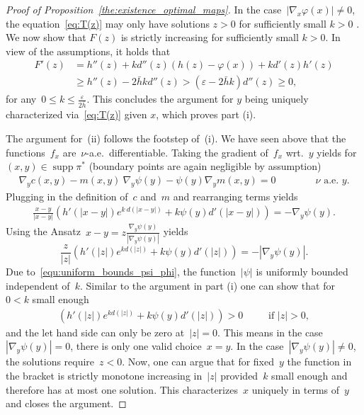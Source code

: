 \documentclass{article}
\theoremstyle{definition}
\DeclareMathOperator{\supp}{supp}
\begin{document}
\begin{proof}[Proof of Proposition~\ref{the:existence_optimal_maps}]
In the case~$|\nabla_x \varphi(x)| \neq 0$, the equation~\eqref{eq:T(z)} may only have solutions $z > 0$ for sufficiently small $k >0$ . We  now show that $F(z)$ is strictly increasing for sufficiently small $k >0$. In view of the assumptions, it holds that
\begin{align}
    F'(z) & = h''(z) +  k   d''(z) \left(h(z) - \varphi(x) \right) + k d'(z) h'(z) \\
    & \geq  h''(z) - 2 \bar{h} k d''(z) > (\varepsilon - 2 \bar{h} k) d''(z) \geq 0,
\end{align} 
for any~$0\leq k\leq \frac{\varepsilon}{2 \bar{h}}$.
This concludes the argument for $y$ being uniquely characterized via~\eqref{eq:T(z)} given $x$, which proves part (i).






The argument for~(ii) follows the footstep of~(i). We have seen above that the functions~$f_x$ are~$\nu$-a.e.~differentiable.  Taking the gradient of~$f_x$ wrt.~$y$  yields for~$(x,y) \in \supp \pi^*$ (boundary points are again negligible by assumption)
\begin{align}\label{equ:characteristic_equation_dual_optimal_map}
    \nabla_y c(x,y) - m(x,y) \ \nabla_y \psi (y)   - \psi (y)  \nabla_y  m(x,y) = 0 \qquad \qquad \mbox{$\nu$ a.e.~$y$.}
\end{align}
    Plugging in the definition of~$c$ and~$m$ and rearranging terms yields
    \begin{align}
        \frac{x-y}{|x-y|} \left( h'(|x-y|) e^{k \ d(|x-y|)} + k \psi(y)  d'(|x-y|)  \right) = - \nabla_y \psi(y).
    \end{align}
    Using the Ansatz~$x-y = z \frac{\nabla_y \psi(y)}{|\nabla_y \psi(y)|}$ yields
\[
\frac{z}{|z|}  \left(  h'(|z|  ) e^{k d(|z| )}   + k  \psi (y)    d'(|z|)  \right) = - | \nabla_y \psi(y)|.
\]
    Due to~\eqref{equ:uniform_bounds_psi_phi}, the function~$|\psi|$ is uniformly bounded independent of~$k$. Similar to the argument in part (i) one can show that for~$0<k$ small enough
    \begin{align*}
       \left(  h'(|z|  ) e^{k d(|z| )}   + k  \psi (y)    d'(|z|)  \right) > 0~ \qquad \mbox{ if }  |z| >0,
    \end{align*}
    and the let hand side can only be zero at~$|z|=0$. This means in the case~$| \nabla_y \psi(y)| =0$, there is only one valid choice~$x=y$. In the case~$| \nabla_y \psi(y)| \neq 0$, the solutions require~$z < 0$. Now, one can argue that for fixed~$y$ the function in the bracket is strictly monotone increasing in~$|z|$ provided~$k$ small enough and therefore has at most one solution. This characterizes~$x$ uniquely in terms of~$y$ and closes the argument.  
\end{proof}
\end{document}
